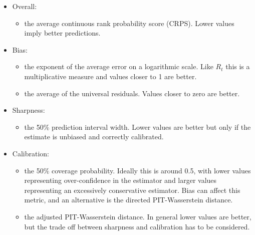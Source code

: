 \documentclass[a4paper, 12pt, twoside]{article}
\begin{document}
\begin{itemize}
 \item Overall:
 \begin{itemize}
  \item the average continuous rank probability score (CRPS). Lower values imply better predictions.
 \end{itemize}
 \item Bias:
 \begin{itemize}
  \item the exponent of the average error on a logarithmic scale. Like $R_t$ this is a multiplicative measure and values closer to 1 are better.
  \item the average of the universal residuals. Values closer to zero are better.
 \end{itemize}
 \item Sharpness:
 \begin{itemize}
  \item the 50\% prediction interval width. Lower values are better but only if the estimate is unbiased and correctly calibrated.
 \end{itemize}
 \item Calibration:
  \begin{itemize}
  \item the 50\% coverage probability. Ideally this is around 0.5, with lower values representing over-confidence in the estimator and larger values representing an excessively conservative estimator. Bias can affect this metric, and an alternative is the directed PIT-Wasserstein distance.
  \item the adjusted PIT-Wasserstein distance. In general lower values are better, but the trade off between sharpness and calibration has to be considered.
  \end{itemize}
\end{itemize}


\end{document}
